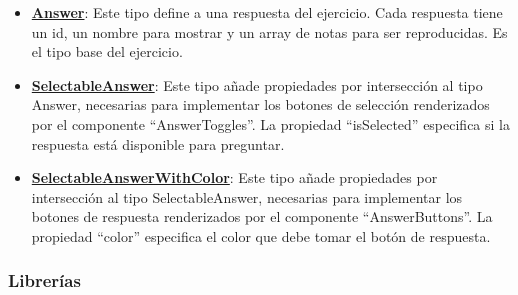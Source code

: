 \documentclass[12pt,twoside,titlepage]{report}
\begin{document}
\begin{itemize}
    \begin{figure}[H]
        \centering
        \texttt{[image: Detalles de Implementación/Code/Types/Answer]}
        \caption{Tipo Answer.}
        \label{fig:Answer}
    \end{figure}

    Cada variante de ejercicio utiliza los tipos Answer, SelectableAnswer y SelectableAnswerWithColor. (Ver Figura \ref{fig:Answer}).

    \item \href{https://github.com/alberttogoca/EarFit/blob/main/src/types/index.ts}{\textbf{Answer}}: Este tipo define a una respuesta del ejercicio. Cada respuesta tiene un id, un nombre para mostrar y un array de notas para ser reproducidas. Es el tipo base del ejercicio.
    \item \href{https://github.com/alberttogoca/EarFit/blob/main/src/types/index.ts}{\textbf{SelectableAnswer}}: Este tipo añade propiedades por intersección al tipo Answer, necesarias para implementar los botones de selección renderizados por el componente ``AnswerToggles''. La propiedad ``isSelected'' especifica si la respuesta está disponible para preguntar.
    \item \href{https://github.com/alberttogoca/EarFit/blob/main/src/types/index.ts}{\textbf{SelectableAnswerWithColor}}: Este tipo añade propiedades por intersección al tipo SelectableAnswer, necesarias para implementar los botones de respuesta renderizados por el componente ``AnswerButtons''. La propiedad ``color'' especifica el color que debe tomar el botón de respuesta.

\end{itemize}

\subsubsection{Librerías}
\label{sec:lib}
\end{document}
